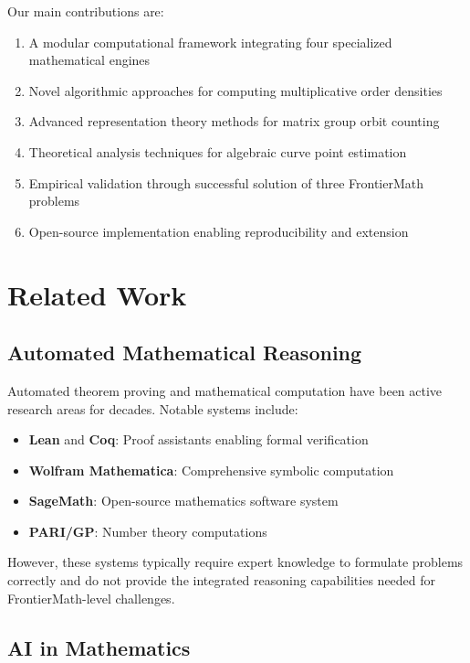 \documentclass[11pt]{article}
\begin{document}
Our main contributions are:

\begin{enumerate}
\item A modular computational framework integrating four specialized mathematical engines
\item Novel algorithmic approaches for computing multiplicative order densities
\item Advanced representation theory methods for matrix group orbit counting
\item Theoretical analysis techniques for algebraic curve point estimation
\item Empirical validation through successful solution of three FrontierMath problems
\item Open-source implementation enabling reproducibility and extension
\end{enumerate}

\section{Related Work}

\subsection{Automated Mathematical Reasoning}

Automated theorem proving and mathematical computation have been active research areas for decades. Notable systems include:

\begin{itemize}
\item \textbf{Lean} and \textbf{Coq}: Proof assistants enabling formal verification
\item \textbf{Wolfram Mathematica}: Comprehensive symbolic computation
\item \textbf{SageMath}: Open-source mathematics software system
\item \textbf{PARI/GP}: Number theory computations
\end{itemize}

However, these systems typically require expert knowledge to formulate problems correctly and do not provide the integrated reasoning capabilities needed for FrontierMath-level challenges.

\subsection{AI in Mathematics}
\end{document}
